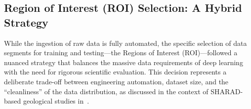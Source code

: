 \subsection{Region of Interest (ROI) Selection: A Hybrid Strategy}
While the ingestion of raw data is fully automated, the specific selection of data segments for training and testing---the Regions of Interest (ROI)---followed a nuanced strategy that balances the massive data requirements of deep learning with the need for rigorous scientific evaluation.
This decision represents a deliberate trade-off between engineering automation, dataset size, and the \enquote{cleanliness} of the data distribution, as discussed in the context of SHARAD-based geological studies in~\cite{foss2017sharad3d,yebasse2025advances}.

